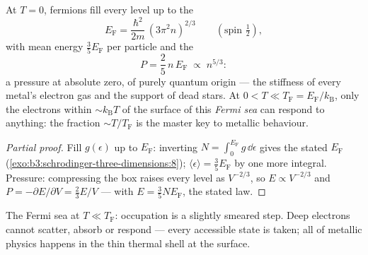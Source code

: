 \begin{theorem}\label{thm:b3:quantum-statistics:fermi}
At $T = 0$, fermions fill every level up to the \emph{}
\[
E_{\text{F}} = \frac{\hbar^2}{2m}\,(3\pi^2n)^{2/3}
\qquad (\text{spin } \tfrac12) ,
\]
with mean energy $\tfrac35 E_{\text{F}}$ per particle and the
\emph{}
\[
P = \frac25\,n\,E_{\text{F}} \;\propto\; n^{5/3} :
\]
a pressure at absolute zero, of purely quantum origin --- the
stiffness of every metal's electron gas and the support of dead
stars. At $0 < T \ll T_{\text{F}} = E_{\text{F}}/k_{\text{B}}$,
only the electrons within $\sim k_{\text{B}}T$ of the surface of
this \emph{Fermi sea} can respond to anything: the fraction
$\sim T/T_{\text{F}}$ is the master key to metallic behaviour.
\end{theorem}

\begin{proof}[Partial proof]
Fill $g(\epsilon)$ up to $E_{\text{F}}$: inverting $N = \int_0^{
E_{\text{F}}}g\,\dd\epsilon$ gives the stated $E_{\text{F}}$
(\cref{exo:b3:schrodinger-three-dimensions:8}); $\langle\epsilon
\rangle = \tfrac35 E_{\text{F}}$ by one more integral. Pressure:
compressing the box raises every level as $V^{-2/3}$, so $E
\propto V^{-2/3}$ and $P = -\partial E/\partial V = \tfrac23 E/V$
--- with $E = \tfrac35 NE_{\text{F}}$, the stated law.
\end{proof}

\begin{omfigure}

{\small The Fermi sea at $T \ll T_{\text{F}}$: occupation is a
slightly smeared step. Deep electrons cannot scatter, absorb or
respond --- every accessible state is taken; all of metallic
physics happens in the thin thermal shell at the surface.}
\end{omfigure}

